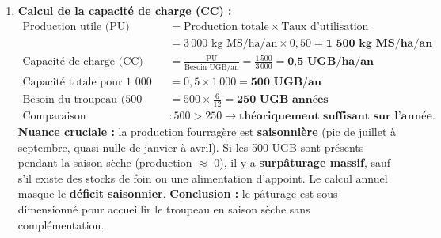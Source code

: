 \documentclass[11pt]{article}
\begin{document}
\begin{exoresolu}
\begin{enumerate}
\begin{enumerate}
    \end{enumerate}
    \item \textbf{Calcul de la capacité de charge (CC) :}
    \begin{align*}
        \text{Production utile (PU)} &= \text{Production totale} \times \text{Taux d'utilisation} \\
        &= 3\,000 \text{ kg MS/ha/an} \times 0,50 = \textbf{1 500 kg MS/ha/an} \\
        \text{Capacité de charge (CC)} &= \frac{\text{PU}}{\text{Besoin UGB/an}} = \frac{1\,500}{3\,000} = \textbf{0,5 UGB/ha/an} \\
        \text{Capacité totale pour 1 000 ha} &= 0,5 \times 1\,000 = \textbf{500 UGB/an} \\
        \text{Besoin du troupeau (500 UGB, 6 mois)} &= 500 \times \frac{6}{12} = \textbf{250 UGB-années} \\
        \text{Comparaison} &: 500 > 250 \rightarrow \textbf{théoriquement suffisant sur l'année}.
    \end{align*}
    \textbf{Nuance cruciale :} la production fourragère est \textbf{saisonnière} (pic de juillet à septembre, quasi nulle de janvier à avril). Si les 500 UGB sont présents pendant la saison sèche (production $\approx$ 0), il y a \textbf{surpâturage massif}, sauf s'il existe des stocks de foin ou une alimentation d'appoint. Le calcul annuel masque le \textbf{déficit saisonnier}. \textbf{Conclusion :} le pâturage est sous-dimensionné pour accueillir le troupeau en saison sèche sans complémentation.
\end{enumerate}
\end{exoresolu}
\end{document}
